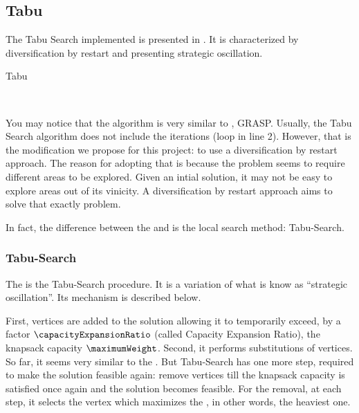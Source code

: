 \subsection{Tabu}
\label{section:tabu}

The Tabu Search implemented is presented in \cite{bib:tabu}. It is characterized by diversification by restart and presenting strategic oscillation.

\begin{algorithm}[H]
    \caption{Tabu}
    \begin{algorithmic}[1]
        \Require{$\nit, \greedyParameter$}
            \EndIf
        \EndFor
        \\
    \end{algorithmic}
    \label{algorithm:tabu}
\end{algorithm}

You may notice that the algorithm is very similar to , GRASP. Usually, the Tabu Search algorithm does not include the iterations (loop in line 2). However, that is the modification we propose for this project: to use a diversification by restart approach. The reason for adopting that is because the problem seems to require different areas to be explored. Given an intial solution, it may not be easy to explore areas out of its vinicity. A diversification by restart approach aims to solve that exactly problem.

In fact, the difference between the  and  is the local search method: Tabu-Search.

\subsubsection{Tabu-Search}

The  is the Tabu-Search procedure. It is a variation of what is know as ``strategic oscillation''. Its mechanism is described below.

First, vertices are added to the solution allowing it to  temporarily exceed, by a factor $\capacityExpansionRatio$ (called Capacity Expansion Ratio), the knapsack capacity $\maximumWeight$. Second, it performs substitutions of vertices. So far, it seems very similar to the . But Tabu-Search has one more step, required to make the solution feasible again: remove vertices till the knapsack capacity is satisfied once again and the solution becomes feasible. For the removal, at each step, it selects the vertex which maximizes the \greedyCriteriaText, in other words, the heaviest one.


